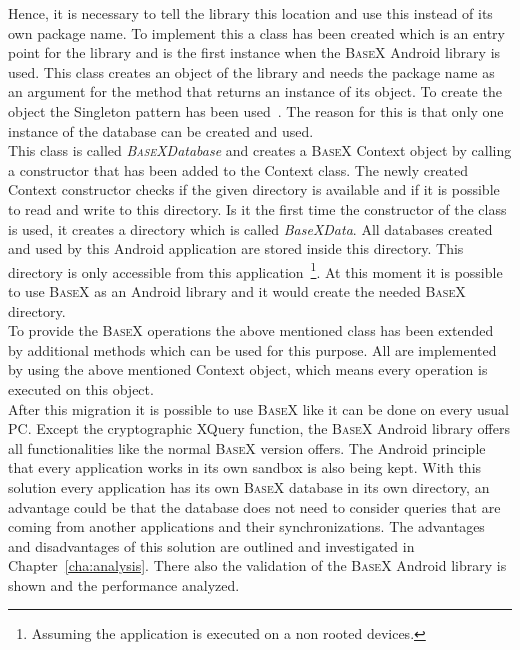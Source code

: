 Hence, it is necessary to tell the library this location and use this instead of its own package name.
To implement this a class has been created which is an entry point for the library and is the first instance when the \textsc{BaseX} Android library is used.
This class creates an object of the library and needs the package name as an argument for the method that returns an instance of its object.
To create the object the Singleton pattern has been used~\cite{gamma2010entwurfsmuster}.
The reason for this is that only one instance of the database can be created and used.\\
This class is called \textit{\textsc{BaseX}Database} and creates a \textsc{BaseX} Context object by calling a constructor that has been added to the Context class.
The newly created Context constructor checks if the given directory is available and if it is possible to read and write to this directory.
Is it the first time the constructor of the class is used, it creates a directory which is called \textit{BaseXData}.
All databases created and used by this Android application are stored inside this directory.
This directory is only accessible from this application~\footnote{Assuming the application is executed on a non rooted devices.}.
At this moment it is possible to use \textsc{BaseX} as an Android library and it would create the needed \textsc{BaseX} directory.\\
To provide the \textsc{BaseX} operations the above mentioned class has been extended by additional methods which can be used for this purpose.
All are implemented by using the above mentioned Context object, which means every operation is executed on this object.\\
After this migration it is possible to use \textsc{BaseX} like it can be done on every usual PC.
Except the cryptographic XQuery function, the \textsc{BaseX} Android library offers all functionalities like the normal \textsc{BaseX} version offers.
The Android principle that every application works in its own sandbox is also being kept.
With this solution every application has its own \textsc{BaseX} database in its own directory, an advantage could be that the database does not need to consider queries that are coming from another applications and their synchronizations.
The advantages and disadvantages of this solution are outlined and investigated in Chapter~\ref{cha:analysis}.
There also the validation of the \textsc{BaseX} Android library is shown and the performance analyzed.


